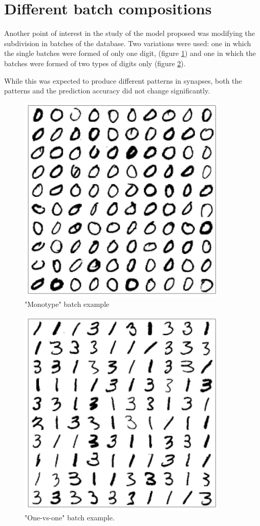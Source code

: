 \documentclass[a4paper]{report}
\begin{document}
\section{Different batch compositions}

Another point of interest in the study of the model proposed was modifying the subdivision in batches of the database.
Two variations were used:
one in which the single batches were formed of only one digit, (figure \ref{monotype}) and one in which the batches were formed of two types of digits only (figure \ref{1v1}).

While this was expected to produce different patterns in synapses, both the patterns and the prediction accuracy did not change significantly.

\begin{figure} [H]
    \centering
    \includegraphics [width=10cm ] {o/0.png}
    \caption{"Monotype" batch example}
    \label{monotype}
\end{figure}

\begin{figure} [H]
    \centering
    \includegraphics [width=10cm ] {o/31.png}
    \caption{"One-vs-one" batch example.}
    \label{1v1}
\end{figure}
\end{document}
